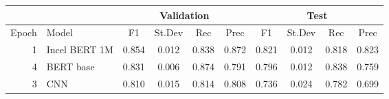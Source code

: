 \begin{tabular}{rl|cccc|cccc}
  \hline
                &                    &  \multicolumn{4}{c|}{Validation}              & \multicolumn{4}{c}{Test} \\
  \hline
          Epoch &              Model &      F1 &      St.Dev &   Rec & Prec &       F1 &       St.Dev &  Rec   &  Prec \\
  \hline
      1 & Incel BERT 1M &   0.854 &          0.012 &    0.838 &     0.872 &    0.821 &           0.012 &     0.818 &      0.823 \\
      4 &     BERT base &   0.831 &          0.006 &    0.874 &     0.791 &    0.796 &           0.012 &     0.838 &      0.759 \\
      3 &           CNN &   0.810 &          0.015 &    0.814 &     0.808 &    0.736 &           0.024 &     0.782 &      0.699 \\
  \hline
\end{tabular}
